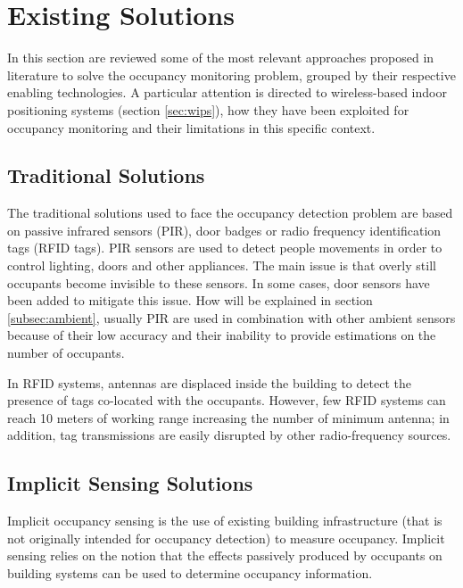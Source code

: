 \section{Existing Solutions}
\label{sec:soa}
In this section are reviewed some of the most relevant approaches proposed in literature to solve the occupancy monitoring problem, grouped by their respective enabling technologies. A particular attention is directed to wireless-based indoor positioning systems (section \ref{sec:wips}), how they have been exploited for occupancy monitoring and their limitations in this specific context.

\subsection{Traditional Solutions}
The traditional solutions used to face the occupancy detection problem are based on passive infrared sensors (PIR), door badges or radio frequency identification tags (RFID tags). PIR sensors are used to detect people movements in order to control lighting, doors and other appliances.
The main issue is that overly still occupants become invisible to these sensors. In some cases, door sensors have been added to mitigate this issue. How will be explained in section \ref{subsec:ambient}, usually PIR are used in combination with other ambient sensors because of their low accuracy and their inability to provide estimations on the number of occupants.

In RFID systems, antennas are displaced inside the building to detect the presence of tags co-located with the occupants. However, few RFID systems can reach 10 meters of working range increasing the number of minimum antenna; in addition, tag transmissions are easily disrupted by other radio-frequency sources.


\subsection{Implicit Sensing Solutions}
\label{subsec:implicit}
Implicit occupancy sensing is the use of existing building infrastructure (that is not originally intended for occupancy detection) to measure occupancy. Implicit sensing relies on the notion that the effects passively produced by occupants on building systems can be used to determine occupancy information.


